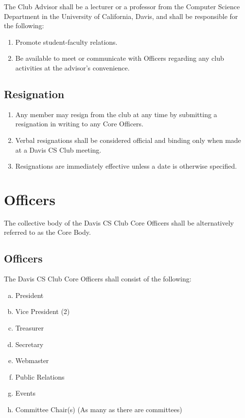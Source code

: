 \documentclass{article}
\newenvironment{li}{
\begin{enumerate}
  \setlength{\itemsep}{1pt}
  \setlength{\parskip}{0pt}
  \setlength{\parsep}{0pt}
}{\end{enumerate}}
\begin{document}
\noindent The Club Advisor shall be a lecturer or a professor from the Computer Science Department in the University of California, Davis, and shall be responsible for the following:
	\begin{li}
	\item Promote student-faculty relations.
	\item Be available to meet or communicate with Officers regarding any club activities at the advisor's convenience.
	\end{li}

\subsection{Resignation}
\begin{li}
\item Any member may resign from the club at any time by submitting a resignation in writing to any Core Officers.
\item Verbal resignations shall be considered official and binding only when made at a Davis CS Club meeting.
\item Resignations are immediately effective unless a date is otherwise specified.
\end{li}


\section{Officers}
The collective body of the Davis CS Club Core Officers shall be alternatively referred to as the Core Body.

\subsection{Officers}
The Davis CS Club Core Officers shall consist of the following:
\begin{enumerate}[a.]
  \setlength{\itemsep}{1pt}
  \setlength{\parskip}{0pt}
  \setlength{\parsep}{0pt}
\item President
\item Vice President (2)
\item Treasurer
\item Secretary
\item Webmaster
\item Public Relations
\item Events
\item Committee Chair(s) (As many as there are committees)
\end{enumerate}
\end{document}
